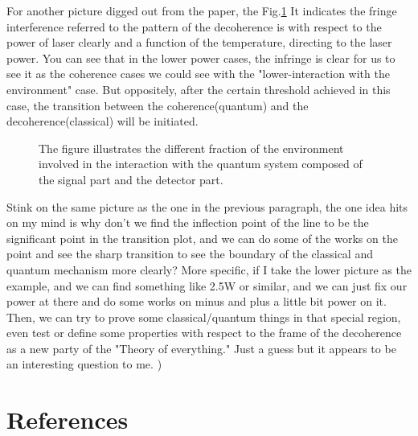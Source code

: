 \documentclass[final,1p,12pt]{elsarticle}
\begin{document}
For another picture digged out from the paper, the Fig.\ref{444} It indicates the fringe interference referred to the pattern of the decoherence is with respect to the power of laser clearly and a function of the temperature, directing to the laser power. You can see that in the lower power cases, the infringe is clear for us to see it as the coherence cases we could see with the "lower-interaction with the environment" case. But oppositely, after the certain threshold achieved in this case, the transition between the coherence(quantum) and the decoherence(classical) will be initiated.\\ 
\begin{figure}
\begin{center}
\end{center}
\caption{The figure illustrates the different fraction of the environment involved in the interaction with the quantum system composed of the signal part and the detector part.}
\label{444}
\end{figure}

Stink on the same picture as the one in the previous paragraph, the one idea hits on my mind is why don't we find the inflection point of the line to be the significant point in the transition plot, and we can do some of the works on the point and see the sharp transition to see the boundary of the classical and quantum mechanism more clearly? More specific, if I take the lower picture as the example, and we can find something like 2.5W or similar, and we can just fix our power at there and do some works on minus and plus a little bit power on it. Then, we can try to prove some classical/quantum things in that special region, even test or define some properties with respect to the frame of the decoherence as a new party of the "Theory of everything." Just a guess but it appears to be an interesting question to me. )\\





\newpage
\section*{References}


\def\bibname{\Large\bf References}
\def\refname{\Large\bf References}
\pagestyle{plain}

\end{document}
